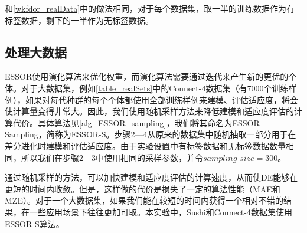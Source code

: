 
和\autoref{wkfdor_realData}中的做法相同，对于每个数据集，取一半的训练数据作为有标签数据，剩下的一半作为无标签数据。

\subsection{处理大数据}

ESSOR使用演化算法来优化权重，而演化算法需要通过迭代来产生新的更优的个体。对于大数据集，例如\autoref{table_realSets}中的Connect-4数据集（有7000个训练样例），如果对每代种群的每个个体都使用全部训练样例来建模、评估适应度，将会使计算量变得非常大。因此，我们使用随机采样方法来降低建模和适应度评估的计算代价。具体算法见\autoref{alg_ESSOR_sampling}，我们将其命名为ESSOR-Sampling，简称为ESSOR-S。步骤2—4从原来的数据集中随机抽取一部分用于在差分进化时建模和评估适应度。由于实验设置中有标签数据和无标签数据数量相同，所以我们在步骤2—3中使用相同的采样参数，并令\(sampling\_size = 300\)。

通过随机采样的方法，可以加快建模和适应度评估的计算速度，从而使DE能够在更短的时间内收敛。但是，这样做的代价是损失了一定的算法性能（MAE和MZE）。对于一个大数据集，如果我们能在较短的时间内获得一个相对不错的结果，在一些应用场景下往往更加可取。本实验中，Sushi和Connect-4数据集使用ESSOR-S算法。

~\\
~\\
~\\
~\\


